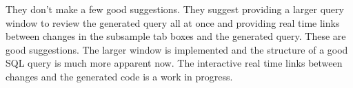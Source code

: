 \documentclass[11pt]{tise_style}
\begin{document}
They don't make a few good suggestions.  They suggest providing a larger query window to review the generated query all at once and providing real time links between changes in the subsample tab boxes and the generated query.  These are good suggestions.  The larger window is implemented and the structure of a good SQL query is much more apparent now.  The interactive real time links between changes and the generated code is a work in progress.
\end{document}
